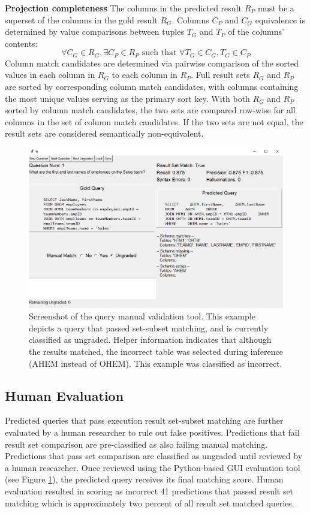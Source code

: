 \textbf{Projection completeness} The columns in the predicted result $R_P$ must be a superset of the columns in the gold result $R_G$. Columns $C_P$ and $C_G$ equivalence is determined by value comparisons between tuples $T_G$ and $T_P$ of the columns' contents:
\[\forall C_G \in R_G, \exists C_P \in R_P \text{ such that } \forall T_G \in C_G, T_G \in C_P\]
Column match candidates are determined via pairwise comparison of the sorted values in each column in $R_G$ to each column in $R_P$. Full result sets $R_G$ and $R_P$ are sorted by corresponding column match candidates, with columns containing the most unique values serving as the primary sort key. With both $R_G$ and $R_P$ sorted by column match candidates, the two sets are compared row-wise for all columns in the set of column match candidates. If the two sets are not equal, the result sets are considered semantically non-equivalent.


\begin{figure}
  \centering
  \includegraphics[width=\linewidth]{figures/manual-validation-tool.PNG}
  \caption{Screenshot of the query manual validation tool. This example depicts a query that passed set-subset matching, and is currently classified as ungraded. Helper information indicates that although the results matched, the incorrect table was selected during inference (AHEM instead of OHEM). This example was classified as incorrect.}
  \label{fig:manual-validation-tool}
\end{figure}

\subsection{Human Evaluation}
Predicted queries that pass execution result set-subset matching are further evaluated by a human researcher to rule out false positives.
Predictions that fail result set comparison are pre-classified as also failing manual matching.
Predictions that pass set comparison are classified as ungraded until reviewed by a human researcher.
Once reviewed using the Python-based GUI evaluation tool (see Figure \ref{fig:manual-validation-tool}), the predicted query receives its final matching score.
Human evaluation resulted in scoring as incorrect 41 predictions that passed result set matching which is approximately two percent of all result set matched queries.




